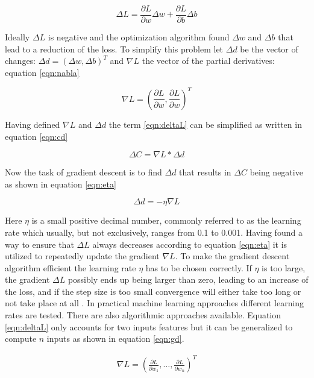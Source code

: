 \begin{equation}
 \Delta L = \frac{\partial L}{\partial w} \Delta w + \frac{\partial L}{\partial b} \Delta b
\label{eqn:deltaL} 
\end{equation}


Ideally $\Delta L$ is negative and the optimization algorithm found $\Delta w$ and $\Delta b$ that lead to a
reduction of the loss. To simplify this problem let $\Delta d$ be the vector of changes:
$\Delta d = (\Delta w , \Delta b)^T $ and $\nabla L$ the vector of the partial derivatives: equation
\ref{eqn:nabla}


\begin{equation}
 \nabla L = \left(\frac{\partial L}{\partial w}, \frac{\partial L}{\partial w}\right)^T
\label{eqn:nabla}
\end{equation}

Having defined $\nabla L$ and $\Delta d$ the term \ref{eqn:deltaL} can be simplified as written in equation \ref{eqn:cd}

\begin{equation}
\Delta C = \nabla L * \Delta d
 \label{eqn:cd}
\end{equation}


Now the task of gradient descent is to find $\Delta d$ that results in $\Delta C$ being negative
as shown in equation \ref{eqn:eta}

\begin{equation}
 \Delta d = -\eta \nabla L
 \label{eqn:eta}
\end{equation}


Here $\eta$ is a small positive decimal number, commonly referred to as the learning rate which usually, but
not exclusively, ranges from 0.1 to 0.001.  Having found a way to ensure that $\Delta L$ always decreases
according to equation \ref{eqn:eta} it is utilized to repeatedly update the gradient $\nabla L$. To make the
gradient descent algorithm efficient the learning rate $\eta$ has to be chosen correctly. If $\eta$ is too
large, the gradient $\Delta L$ possibly ends up being larger than zero, leading to an increase of the loss, and if
the step size is too small convergence will either take too long or not take place at all
\cite{bergstra2011algorithms}. In practical machine learning approaches different learning rates are
tested. There are also algorithmic approaches available. Equation \ref{eqn:deltaL} only accounts for two inputs
features but it can be generalized to compute $n$ inputs as shown in equation \ref{eqn:gd}.


\begin{eqnarray}
 \nabla L = \left(\frac{\partial L}{\partial w_1}, \ldots ,
 \frac{\partial L}{\partial w_n}\right)^T
 \label{eqn:gd}
\end{eqnarray}



